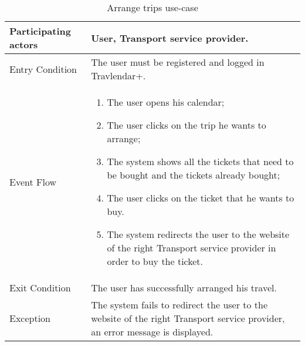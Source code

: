 \begin{table}[H]
	\begin{center}
		\begin{tabular}{ | p{} | p{} | }
		\hline
		Participating actors &  User, Transport service provider.\\
		\hline
		Entry Condition & The user must be registered and logged in Travlendar+.\\
		\hline
		Event Flow & 
			\begin{enumerate}
				\item The user opens his calendar;
				\item The user clicks on the trip he wants to arrange;
				\item The system shows all the tickets that need to be bought and the tickets already bought;
				\item The user clicks on the ticket that he wants to buy.
				\item The system redirects the user to the website of the right Transport service provider in order to buy the ticket.
			\end{enumerate} \\
		\hline
		Exit Condition & The user has successfully arranged his travel. \\
		\hline
		Exception & The system fails to redirect the user to the website of the right Transport service provider, an error message is displayed.\\ 
		\hline
		\end{tabular}
	\end{center}
	\caption{Arrange trips use-case}
\end{table}